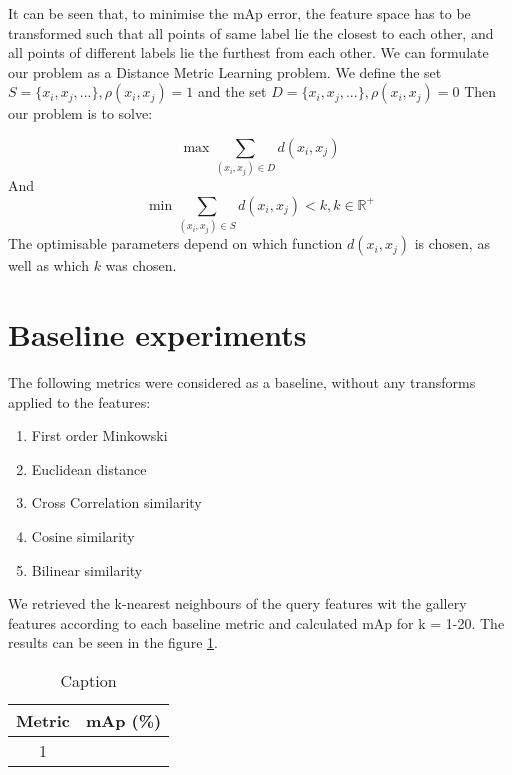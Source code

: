 \documentclass[10pt,technote]{IEEEtran}
\begin{document}
It can be seen that, to minimise the mAp error, the feature space has to be transformed such that all points of same label lie the closest to each other, and all points of different labels lie the furthest from each other.
We can formulate our problem as a Distance Metric Learning problem. We define the set $S = \lbrace x_i, x_j, ...\rbrace, \rho(x_i, x_j) = 1$ and the set $D = \lbrace x_i, x_j, ...\rbrace,  \rho(x_i, x_j) = 0$
Then our problem is to solve:

\begin{equation}
\max \sum_{(x_i, x_j) \in D} d(x_i, x_j)
\end{equation}
And
\begin{equation}
\min \sum_{(x_i, x_j) \in S} d(x_i, x_j) < k, k \in \mathbb{R^+}
\end{equation}
The optimisable parameters depend on which function $d(x_i, x_j)$ is chosen, as well as which $k$ was chosen.

\section{Baseline experiments}

The following metrics were considered as a baseline, without any transforms applied to the features:
\begin{enumerate}
    \item First order Minkowski
    \item Euclidean distance
    \item Cross Correlation similarity
    \item Cosine similarity
    \item Bilinear similarity
\end{enumerate}

We retrieved the k-nearest neighbours of the query features wit the gallery features according to each baseline metric and calculated mAp for k = 1-20. The results can be seen in the figure \ref{}.
\begin{table}[]
    \centering
    \begin{tabular}{c|c}
        Metric & mAp (\%) \\ \hline \hline
        1 & 
    \end{tabular}
    \caption{Caption}
    \label{tab:my_label}
\end{table}







\end{document}
